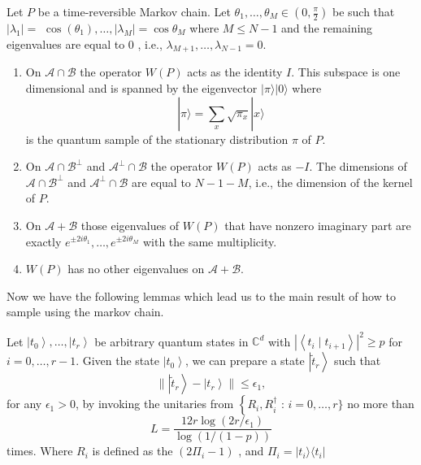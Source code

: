 \begin{theorem}
	
Let $P$ be a time-reversible Markov chain. Let $\theta_1, \ldots, \theta_M \in\left(0, \frac{\pi}{2}\right)$ be such that $\left|\lambda_1\right|=$ $\cos \left(\theta_1\right), \ldots,\left|\lambda_M\right|=\cos \theta_M$ where $M \leq N-1$ and the remaining eigenvalues are equal to 0 , i.e., $\lambda_{M+1}, \ldots, \lambda_{N-1}=0$.
\begin{enumerate}
	 

\item On $\mathcal{A} \cap \mathcal{B}$ the operator $W(P)$ acts as the identity $I$. This subspace is one dimensional and is spanned by the eigenvector $|\pi\rangle|0\rangle$ where
$$
|\pi\rangle=\sum_x \sqrt{\pi_x}|x\rangle
$$
is the quantum sample of the stationary distribution $\pi$ of $P$.
\item On $\mathcal{A} \cap \mathcal{B}^{\perp}$ and $\mathcal{A}^{\perp} \cap \mathcal{B}$ the operator $W(P)$ acts as $-I$. The dimensions of $\mathcal{A} \cap \mathcal{B}^{\perp}$ and $\mathcal{A}^{\perp} \cap \mathcal{B}$ are equal to $N-1-M$, i.e., the dimension of the kernel of $P$.
\item On $\mathcal{A}+\mathcal{B}$ those eigenvalues of $W(P)$ that have nonzero imaginary part are exactly $e^{ \pm 2 i \theta_1}, \ldots, e^{ \pm 2 i \theta_M}$ with the same multiplicity.
\item $W(P)$ has no other eigenvalues on $\mathcal{A}+\mathcal{B}$.
\end{enumerate}
\end{theorem} 
Now we have the following lemmas which lead us to the main result of how to sample  using the markov chain.
\begin{lemma}
	 Let $\left|t_0\right\rangle, \ldots,\left|t_r\right\rangle$ be arbitrary quantum states in $\mathbb{C}^d$ with $\left|\left\langle t_i \mid t_{i+1}\right\rangle\right|^2 \geq p$ for $i=0, \ldots, r-1$. Given the state $\left|t_0\right\rangle$, we can prepare a state $\left|\tilde{t}_r\right\rangle$ such that
	$$
	\|\left|\tilde{t}_r\right\rangle-\left|t_r\right\rangle \| \leq \epsilon_1,
	$$
	for any $\epsilon_1>0$, by invoking the unitaries from $\left\{R_i, R_i^{\dagger}\right.$ : $i=0, \ldots, r\}$ no more than
	$$
	L=\frac{12 r \log \left(2 r / \epsilon_1\right)}{\log (1 /(1-p))}
	$$
	times. Where $R_i$ is defined as the $(2\Pi_i-1)$ , and $\Pi_i=|t_i\rangle\langle t_i |$
\end{lemma}

